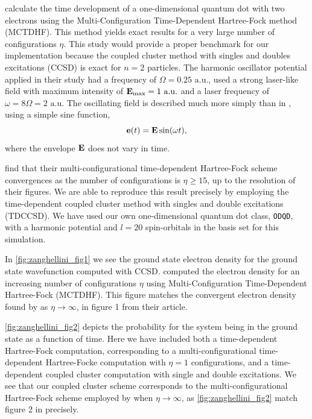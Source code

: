 \citeauthor{Zanghellini04} \cite{Zanghellini04} calculate the time development of a 
one-dimensional quantum dot with two electrons using the Multi-Configuration 
Time-Dependent Hartree-Fock method (MCTDHF). This method yields exact results for 
a very large number of configurations $\eta$. This study would provide a 
proper benchmark for our implementation because the coupled cluster method with singles and 
doubles excitations (CCSD) is exact for $n=2$ particles. 
The harmonic oscillator potential applied in
their study had a frequency of $\Omega=0.25 \text{ a.u.}$, used a strong laser-like field with 
maximum intensity of $\vb{E}_\text{max} = 1 \text{ a.u.}$ and a laser frequency of
$\omega = 8 \Omega = 2 \text{ a.u.}$
The oscillating field is described much more simply than in
\citeauthor{li2005time} \cite{li2005time}, using a simple sine function,
\begin{equation}
    \vb{e}(t) = \vb{E}\sin(\omega t),
\end{equation}
where the envelope $\vb{E}$ does not vary in time.

\citeauthor{Zanghellini04} \cite{Zanghellini04} find that their multi-configurational time-dependent
Hartree-Fock scheme convergences as the number of configurations is 
$\eta \geq15$, up to the resolution of their figures.
We are able to reproduce this result precisely by employing the 
time-dependent coupled cluster method with singles and double excitations (TDCCSD).
We have used our own one-dimensional quantum dot class, \lstinline{ODQD}, with 
a harmonic potential and $l=20$ spin-orbitals
in the basis set for this simulation.

In \autoref{fig:zanghellini_fig1} we see the ground state electron density for the 
ground state wavefunction computed with CCSD. \citeauthor{Zanghellini04} computed the electron
density for an increasing number of configurations $\eta$ using Multi-Configuration
Time-Dependent Hartree-Fock (MCTDHF). This figure matches the convergent electron density found by
\citeauthor{Zanghellini04} as $\eta \to \infty$, in figure 1 from their article. 

\autoref{fig:zanghellini_fig2} depicts the probability for the system being in the ground 
state as a function of time. Here we have included both a time-dependent Hartree-Fock
computation, corresponding to a multi-configurational time-dependent 
Hartree-Focke computation with $\eta=1$ configurations, and 
a time-dependent coupled cluster computation with single and double excitations.
We see that our coupled cluster scheme corresponds to the multi-configurational Hartree-Fock 
scheme employed by \citeauthor{Zanghellini04} when $\eta\to\infty$, as
\autoref{fig:zanghellini_fig2} match figure 2 in
\citeauthor{Zanghellini04} \cite{Zanghellini04} precisely.


